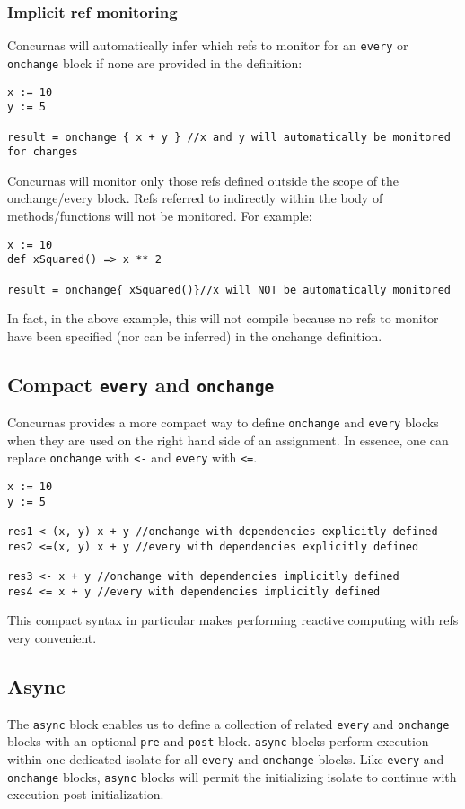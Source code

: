 \documentclass[conc-doc]{subfiles}
\begin{document}
\subsubsection{Implicit ref monitoring}
Concurnas will automatically infer which refs to monitor for an \lstinline{every} or \lstinline{onchange} block if none are provided in the definition:
\begin{lstlisting}
x := 10
y := 5

result = onchange { x + y } //x and y will automatically be monitored for changes
\end{lstlisting}

Concurnas will monitor only those refs defined outside the scope of the onchange/every block. Refs referred to indirectly within the body of methods/functions will not be monitored. For example:
\begin{lstlisting}
x := 10
def xSquared() => x ** 2

result = onchange{ xSquared()}//x will NOT be automatically monitored
\end{lstlisting}

In fact, in the above example, this will not compile because no refs to monitor have been specified (nor can be inferred) in the onchange definition.

\subsection{Compact \lstinline{every} and \lstinline{onchange}}
Concurnas provides a more compact way to define \lstinline{onchange} and \lstinline{every} blocks when they are used on the right hand side of an assignment. In essence, one can replace \lstinline{onchange} with \lstinline{<-} and \lstinline{every} with \lstinline{<=}.

\begin{lstlisting}
x := 10
y := 5

res1 <-(x, y) x + y //onchange with dependencies explicitly defined
res2 <=(x, y) x + y //every with dependencies explicitly defined

res3 <- x + y //onchange with dependencies implicitly defined
res4 <= x + y //every with dependencies implicitly defined
\end{lstlisting}

This compact syntax in particular makes performing reactive computing with refs very convenient.





\subsection{Async}
The \lstinline{async} block enables us to define a collection of related \lstinline{every} and \lstinline{onchange} blocks with an optional \lstinline{pre} and \lstinline{post} block. \lstinline{async} blocks perform execution within one dedicated isolate for all \lstinline{every} and \lstinline{onchange} blocks. Like \lstinline{every} and \lstinline{onchange} blocks, \lstinline{async} blocks will permit the initializing isolate to continue with execution post initialization.
\end{document}
